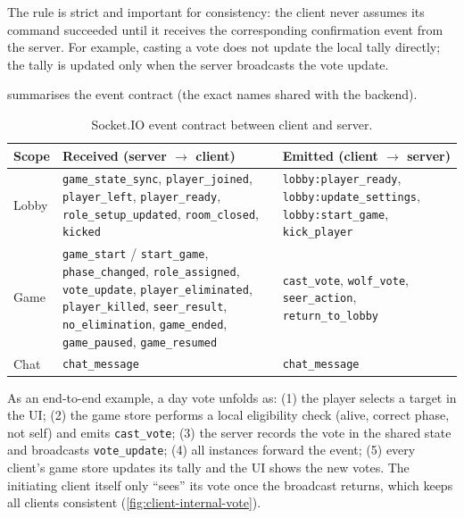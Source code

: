 \documentclass{scrartcl}
\begin{document}
The rule is strict and important for consistency: the client never
assumes its command succeeded until it receives the corresponding
confirmation event from the server. For example, casting a vote does not
update the local tally directly; the tally is updated only when the
server broadcasts the vote update.

 summarises the event contract (the exact names shared
with the backend).

\begin{table}[H]
  \centering
  \small
  \begin{tabular}{@{}p{2.0cm}p{6.0cm}p{5.2cm}@{}}
    \toprule
    \textbf{Scope} & \textbf{Received (server $\to$ client)} & \textbf{Emitted (client $\to$ server)} \\
    \midrule
    Lobby &
      \texttt{game\_state\_sync}, \texttt{player\_joined}, \texttt{player\_left}, \texttt{player\_ready}, \texttt{role\_setup\_updated}, \texttt{room\_closed}, \texttt{kicked} &
      \texttt{lobby:player\_ready}, \texttt{lobby:update\_settings}, \texttt{lobby:start\_game}, \texttt{kick\_player} \\
    \addlinespace
    Game &
      \texttt{game\_start} / \texttt{start\_game}, \texttt{phase\_changed}, \texttt{role\_assigned}, \texttt{vote\_update}, \texttt{player\_eliminated}, \texttt{player\_killed}, \texttt{seer\_result}, \texttt{no\_elimination}, \texttt{game\_ended}, \texttt{game\_paused}, \texttt{game\_resumed} &
      \texttt{cast\_vote}, \texttt{wolf\_vote}, \texttt{seer\_action}, \texttt{return\_to\_lobby} \\
    \addlinespace
    Chat &
      \texttt{chat\_message} &
      \texttt{chat\_message} \\
    \bottomrule
  \end{tabular}
  \caption{Socket.IO event contract between client and server.}
  \label{tab:events}
\end{table}

As an end-to-end example, a day vote unfolds as: (1) the player selects
a target in the UI; (2) the game store performs a local eligibility
check (alive, correct phase, not self) and emits \texttt{cast\_vote};
(3) the server records the vote in the shared state and broadcasts
\texttt{vote\_update}; (4) all instances forward the event; (5) every
client's game store updates its tally and the UI shows the new votes.
The initiating client itself only ``sees'' its vote once the broadcast
returns, which keeps all clients consistent (\cref{fig:client-internal-vote}).
\end{document}

